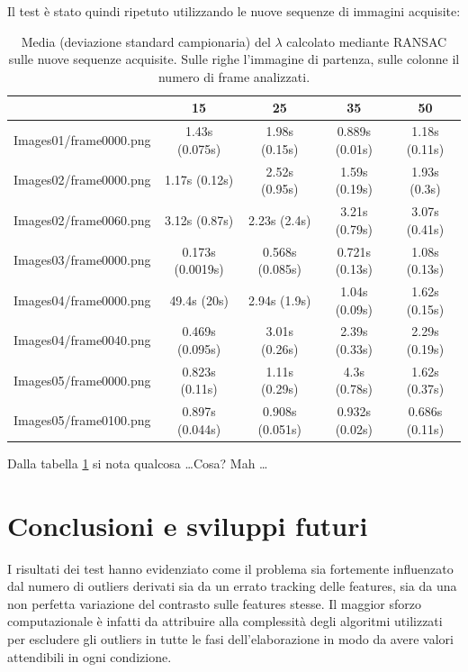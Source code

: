 \documentclass[12pt]{report}
\begin{document}
\noindent Il test \`e stato quindi ripetuto utilizzando le nuove sequenze di immagini acquisite:

\begin{table}[H]
\begin{center}
\begin{tabular}{|c|c|c|c|c|}
	\hline
	& 15 & 25 & 35 & 50 \\ \hline
	Images01/frame0000.png & 1.43s (0.075s) & 1.98s (0.15s) & 0.889s (0.01s) & 1.18s (0.11s)\\ \hline
	Images02/frame0000.png & 1.17s (0.12s) & 2.52s (0.95s) & 1.59s (0.19s) & 1.93s (0.3s)\\ \hline
	Images02/frame0060.png & 3.12s (0.87s) & 2.23s (2.4s) & 3.21s (0.79s) & 3.07s (0.41s)\\ \hline
	Images03/frame0000.png & 0.173s (0.0019s) & 0.568s (0.085s) & 0.721s (0.13s) & 1.08s (0.13s)\\ \hline
	Images04/frame0000.png & 49.4s (20s) & 2.94s (1.9s) & 1.04s (0.09s) & 1.62s (0.15s)\\ \hline
	Images04/frame0040.png & 0.469s (0.095s) & 3.01s (0.26s) & 2.39s (0.33s) & 2.29s (0.19s)\\ \hline
	Images05/frame0000.png & 0.823s (0.11s) & 1.11s (0.29s) & 4.3s (0.78s) & 1.62s (0.37s)\\ \hline
	Images05/frame0100.png & 0.897s (0.044s) & 0.908s (0.051s) & 0.932s (0.02s) & 0.686s (0.11s)\\ \hline
\end{tabular}
\caption{Media (deviazione standard campionaria) del $\lambda$ calcolato mediante RANSAC sulle nuove sequenze acquisite. Sulle righe l'immagine di partenza, sulle colonne il numero di frame analizzati.}
\label{tab:ransNew}
\end{center}
\end{table}


\noindent Dalla tabella \ref{tab:ransNew} si nota qualcosa \dots Cosa? Mah \dots



\chapter{Conclusioni e sviluppi futuri}

\noindent I risultati dei test hanno evidenziato come il problema sia fortemente influenzato dal numero di outliers derivati sia da un errato tracking delle features, sia da una non perfetta variazione del contrasto sulle features stesse. Il maggior sforzo computazionale \`e infatti da attribuire alla complessit\`a degli algoritmi utilizzati per escludere gli outliers in tutte le fasi dell'elaborazione in modo da avere valori attendibili in ogni condizione.\\
\end{document}
